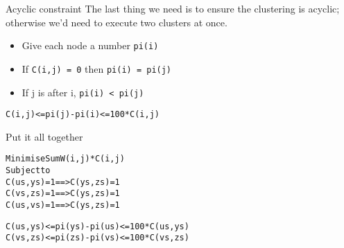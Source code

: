 \documentclass{beamer}
\newcommand{\bl}[1]{\textcolor[rgb]{0.0,0.5,0.9}{#1}}
\newcommand{\fr}[1]{\begin{frame}[fragile]{#1}}
\begin{document}
\fr{Acyclic constraint}
The last thing we need is to ensure the clustering is acyclic; otherwise we'd need to execute two clusters at once.
\begin{itemize}
\item
Give each node a number \bl{\tt pi(i)}
\item
If \bl{\tt C(i,j) = 0} then \bl{\tt pi(i) = pi(j)}
\item
If j is after i, \bl{\tt pi(i) < pi(j)}
\end{itemize}

\begin{alltt}
           \bl{C(i,j)} <= \bl{pi(j)} - \bl{pi(i)} <= 100*\bl{C(i,j)}
\end{alltt}
\end{frame}


\fr{Put it all together}

\begin{alltt}
Minimise   Sum \bl{W(i,j)} * \bl{C(i,j)}
Subject to 
           \bl{C(us,ys)} = 1 ==> \bl{C(ys,zs)} = 1
           \bl{C(vs,zs)} = 1 ==> \bl{C(ys,zs)} = 1
           \bl{C(us,vs)} = 1 ==> \bl{C(ys,zs)} = 1

           \bl{C(us,ys)} <= \bl{pi(ys)} - \bl{pi(us)} <= 100*\bl{C(us,ys)}
           \bl{C(vs,zs)} <= \bl{pi(zs)} - \bl{pi(vs)} <= 100*\bl{C(vs,zs)}
\end{alltt}
\end{frame}
\end{document}
